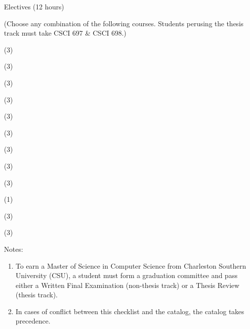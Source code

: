 \begin{reqgroup}{Electives (12 hours)}
\begin{center}%
(Choose any combination of the following courses. Students perusing the thesis track must take CSCI 697 \& CSCI 698.)\vspace{-0.5em}%
\end{center}%
\begin{checklist}
\begin{minipage}[t]{0.5\linewidth}
	\item (3) 
	\item (3) 
	\item (3) 
	\item (3) 
	\item (3) 
	\item (3) 
\end{minipage}
\begin{minipage}[t]{0.5\linewidth}
	\item (3) 
	\item (3) 
	\item (3) 
	\item (1) 
	\item (3) 
	\item (3) 
\end{minipage}
\end{checklist}
\end{reqgroup}

%


Notes:%
\begin{enumerate}\footnotesize
	\item To earn a Master of Science in Computer Science from Charleston Southern University (CSU), a student must form a graduation committee and pass either a Written Final Examination (non-thesis track) or a Thesis Review (thesis track).
	\item In cases of conflict between this checklist and the catalog, the catalog takes precedence.
\end{enumerate}
